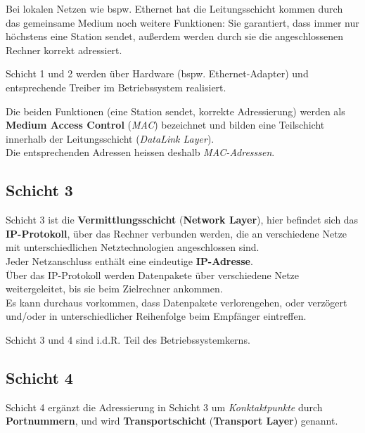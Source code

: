 \noindent
Bei lokalen Netzen wie {bspw.} Ethernet hat die Leitungsschicht kommen durch das gemeinsame Medium noch weitere Funktionen: Sie garantiert, dass immer nur höchstens eine Station sendet, außerdem werden durch sie die angeschlossenen Rechner korrekt adressiert.

\begin{tcolorbox}
    Schicht 1 und 2 werden über Hardware ({bspw.} Ethernet-Adapter) und entsprechende Treiber im Betriebssystem realisiert.
\end{tcolorbox}

\noindent
Die beiden Funktionen (eine Station sendet, korrekte Adressierung) werden als \textbf{Medium Access Control} (\textit{MAC}) bezeichnet und bilden eine Teilschicht innerhalb der Leitungsschicht (\textit{DataLink Layer}).\\
Die entsprechenden Adressen heissen deshalb \textit{MAC-Adresssen}.

\subsection*{Schicht 3}
Schicht 3 ist die \textbf{Vermittlungsschicht} (\textbf{Network Layer}), hier befindet sich das \textbf{IP-Protokoll}, über das Rechner verbunden werden, die an verschiedene Netze mit unterschiedlichen Netztechnologien angeschlossen sind.\\

\noindent
Jeder Netzanschluss enthält eine eindeutige \textbf{IP-Adresse}.\\

\noindent
Über das IP-Protokoll werden Datenpakete über verschiedene Netze weitergeleitet, bis sie beim Zielrechner ankommen.\\

\noindent
Es kann durchaus vorkommen, dass Datenpakete verlorengehen, oder verzögert und/oder in unterschiedlicher Reihenfolge beim Empfänger eintreffen.


\begin{tcolorbox}
    Schicht 3 und 4 sind i.d.R. Teil des Betriebssystemkerns.
\end{tcolorbox}

\subsection*{Schicht 4}
Schicht 4 ergänzt die Adressierung in Schicht 3 um \textit{Konktaktpunkte} durch \textbf{Portnummern}, und wird \textbf{Transportschicht} (\textbf{Transport Layer}) genannt.\\

